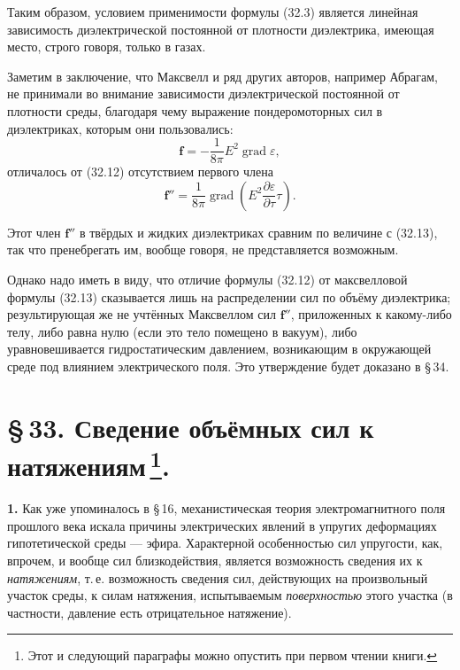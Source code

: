 \documentclass[a4paper,12pt]{article}
\begin{document}
Таким образом, условием применимости формулы (32.3) является линейная
зависимость диэлектрической постоянной от плотности диэлектрика,
имеющая место, строго говоря, только в газах.

Заметим в заключение, что Максвелл и ряд других авторов, например
Абрагам, не принимали во внимание зависимости диэлектрической постоянной
от плотности среды, благодаря чему выражение пондеромоторных сил
в диэлектриках, которым они пользовались:
\begin{equation}
    \mathbf{f} = -\frac{1}{8\pi}E^2\operatorname{grad}\varepsilon,
    \tag{32.13}
\end{equation}
отличалось от (32.12) отсутствием первого члена
\begin{equation}
    \mathbf{f}'' = \frac{1}{8\pi}\operatorname{grad}\!\left(
        E^2\frac{\partial\varepsilon}{\partial\tau}\tau
    \right).
    \tag{32.14}
\end{equation}


Этот член $\mathbf{f}''$ в твёрдых и жидких диэлектриках сравним по
величине с (32.13), так что пренебрегать им, вообще говоря, не
представляется возможным.

Однако надо иметь в виду, что отличие формулы (32.12) от максвелловой
формулы (32.13) сказывается лишь на распределении сил по объёму
диэлектрика; результирующая же не учтённых Максвеллом сил $\mathbf{f}''$,
приложенных к какому-либо телу, либо равна нулю (если это тело помещено
в вакуум), либо уравновешивается гидростатическим давлением, возникающим
в окружающей среде под влиянием электрического поля. Это утверждение
будет доказано в §\,34.

\section*{\S\,33. Сведение объёмных сил к натяжениям\,\footnote{Этот
и следующий параграфы можно опустить при первом чтении книги.}.}

\textbf{1.} Как уже упоминалось в §\,16, механистическая теория
электромагнитного поля прошлого века искала причины электрических
явлений в упругих деформациях гипотетической среды — эфира.
Характерной особенностью сил упругости, как, впрочем, и вообще сил
близкодействия, является возможность сведения их к \textit{натяжениям},
т.\,е. возможность сведения сил, действующих на произвольный участок
среды, к силам натяжения, испытываемым \textit{поверхностью} этого
участка (в частности, давление есть отрицательное натяжение).
\end{document}
